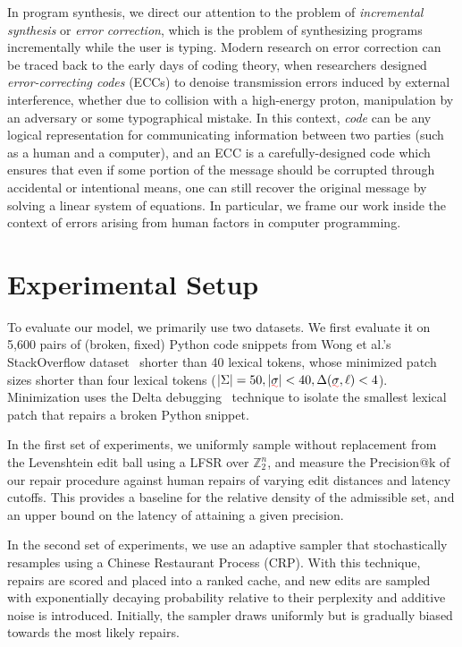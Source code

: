 \documentclass[sigplan,review,anonymous,acmsmall]{acmart}\settopmatter{printfolios=false,printccs=false,printacmref=false}
\begin{document}
In program synthesis, we direct our attention to the problem of \textit{incremental synthesis} or \textit{error correction}, which is the problem of synthesizing programs incrementally while the user is typing. Modern research on error correction can be traced back to the early days of coding theory, when researchers designed \textit{error-correcting codes} (ECCs) to denoise transmission errors induced by external interference, whether due to collision with a high-energy proton, manipulation by an adversary or some typographical mistake. In this context, \textit{code} can be any logical representation for communicating information between two parties (such as a human and a computer), and an ECC is a carefully-designed code which ensures that even if some portion of the message should be corrupted through accidental or intentional means, one can still recover the original message by solving a linear system of equations. In particular, we frame our work inside the context of errors arising from human factors in computer programming.

\section{Experimental Setup}

To evaluate our model, we primarily use two datasets. We first evaluate it on 5,600 pairs of (broken, fixed) Python code snippets from Wong et al.'s StackOverflow dataset~\cite{wong2019syntax} shorter than 40 lexical tokens, whose minimized patch sizes shorter than four lexical tokens ($|\Sigma| = 50, |\err{\sigma}| < 40, \Delta(\err{\sigma}, \ell) < 4$). Minimization uses the Delta debugging~\cite{zeller2002isolating} technique to isolate the smallest lexical patch that repairs a broken Python snippet.

In the first set of experiments, we uniformly sample without replacement from the Levenshtein edit ball using a LFSR over $\mathbb{Z}_2^n$, and measure the Precision@k of our repair procedure against human repairs of varying edit distances and latency cutoffs. This provides a baseline for the relative density of the admissible set, and an upper bound on the latency of attaining a given precision.

In the second set of experiments, we use an adaptive sampler that stochastically resamples using a Chinese Restaurant Process (CRP). With this technique, repairs are scored and placed into a ranked cache, and new edits are sampled with exponentially decaying probability relative to their perplexity and additive noise is introduced. Initially, the sampler draws uniformly but is gradually biased towards the most likely repairs.
\end{document}

